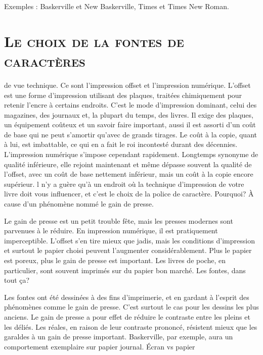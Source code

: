 \documentclass[12pt,a4paper,twocolumn]{book} %
\begin{document}
Exemples : Baskerville et New Baskerville, Times et Times New Roman.
\section{\textsc{Le choix de la fontes de caractères}}
de vue technique. Ce sont l’impression offset et l’impression numérique.
L’offset est une forme d’impression utilisant des plaques, traitées chimiquement pour retenir l’encre à certains endroits. C’est le mode d’impression dominant, celui des magazines, des journaux et, la plupart du temps, des livres. Il exige des plaques, un équipement coûteux et un savoir faire important, aussi il est assorti d’un coût de base qui ne peut s’amortir qu’avec de grands tirages. Le coût à la copie, quant à lui, est imbattable, ce qui en a fait le roi incontesté durant des décennies.
L’impression numérique s’impose cependant rapidement. Longtemps synonyme de qualité inférieure, elle rejoint maintenant et même dépasse souvent la qualité de l’offset, avec un coût de base nettement inférieur, mais un coût à la copie encore supérieur.
l n’y a guère qu’à un endroit où la technique d’impression de votre livre doit vous influencer, et c’est le choix de la police de caractère. Pourquoi? À cause d’un phénomène nommé le gain de presse.

Le gain de presse est un petit trouble fête, mais les presses modernes sont parvenues à le réduire. En impression numérique, il est pratiquement imperceptible. L’offset s’en tire mieux que jadis, mais les conditions d’impression et surtout le papier choisi peuvent l’augmenter considérablement. Plus le papier est poreux, plus le gain de presse est important. Les livres de poche, en particulier, sont souvent imprimés sur du papier bon marché. Les fontes, dans tout ça?

Les fontes ont été dessinées à des fins d’imprimerie, et en gardant à l’esprit des phénomènes comme le gain de presse. C’est surtout le cas pour les dessins les plus anciens. Le gain de presse a pour effet de réduire le contraste entre les pleins et les déliés. Les réales, en raison de leur contraste prononcé, résistent mieux que les garaldes à un gain de presse important. Baskerville, par exemple, aura un comportement exemplaire sur papier journal.
Écran vs papier
\end{document}
